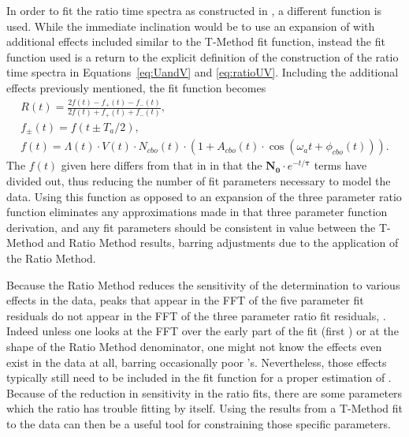 In order to fit the ratio time spectra as constructed in , a different function is used. While the immediate inclination would be to use an expansion of  with additional effects included similar to the T-Method fit function, instead the fit function used is a return to the explicit definition of the construction of the ratio time spectra in Equations~\ref{eq:UandV} and \ref{eq:ratioUV}. Including the additional effects previously mentioned, the fit function becomes
    \begin{gather}
        R(t) = \frac{2f(t) - f_{+}(t) - f_{-}(t)}{2f(t) + f_{+}(t) + f_{-}(t)}, \\
        f_{\pm}(t) = f(t \pm T_{a}/2), \\
        f(t) = \Lambda(t) \cdot V(t) \cdot N_{cbo}(t) \cdot (1 + A_{cbo}(t) \cdot \cos(\omega_{a}t + \phi_{cbo}(t))).
    \label{eq:fullratiofunction}
    \end{gather}
The $f(t)$ given here differs from that in  in that the $\boldsymbol{N_{0}} \cdot e^{-t/\boldsymbol{\tau}}$ terms have divided out, thus reducing the number of fit parameters necessary to model the data. Using this function as opposed to an expansion of the three parameter ratio function eliminates any approximations made in that three parameter function derivation, and any fit parameters should be consistent in value between the T-Method and Ratio Method results, barring adjustments due to the application of the Ratio Method. 

Because the Ratio Method reduces the sensitivity of the \wa determination to various effects in the data, peaks that appear in the FFT of the five parameter fit residuals do not appear in the FFT of the three parameter ratio fit residuals, . Indeed unless one looks at the FFT over the early part of the fit (first ) or at the shape of the Ratio Method denominator, one might not know the effects even exist in the data at all, barring occasionally poor \chisq's. Nevertheless, those effects typically still need to be included in the fit function for a proper estimation of \wa. Because of the reduction in sensitivity in the ratio fits, there are some parameters which the ratio has trouble fitting by itself. Using the results from a T-Method fit to the data can then be a useful tool for constraining those specific parameters.


